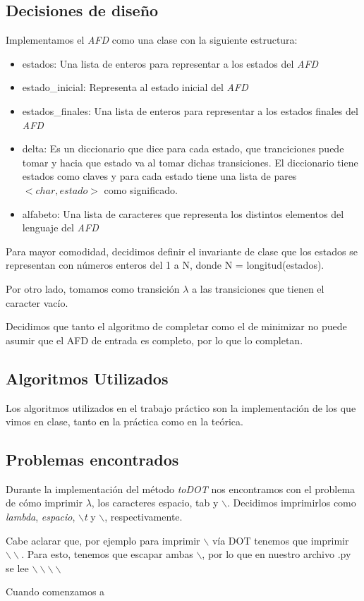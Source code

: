 \subsection{Decisiones de diseño}
Implementamos el \emph{AFD} como una clase con la siguiente estructura:

\begin{itemize}
	\item estados: Una lista de enteros para representar a los estados del \emph{AFD}
	\item estado\_inicial: Representa al estado inicial del \emph{AFD}
	\item estados\_finales: Una lista de enteros para representar a los estados finales del \emph{AFD}
	\item delta: Es un diccionario que dice para cada estado, que tranciciones puede tomar y hacia que estado va al tomar dichas transiciones. El diccionario tiene estados como claves y para cada estado tiene una lista de pares $<char, estado>$ como significado.
	\item alfabeto: Una lista de caracteres que representa los distintos elementos del lenguaje del \emph{AFD}
\end{itemize}

Para mayor comodidad, decidimos definir el invariante de clase que los estados se representan con números enteros del 1 a N, donde N = longitud(estados).

Por otro lado, tomamos como transición $\lambda$ a las transiciones que tienen el caracter vacío.

Decidimos que tanto el algoritmo de completar como el de minimizar no puede asumir que el AFD de entrada es completo, por lo que lo completan.

\subsection{Algoritmos Utilizados}

Los algoritmos utilizados en el trabajo práctico son la implementación de los que vimos en clase, tanto en la práctica como en la teórica.

\subsection{Problemas encontrados}

Durante la implementación del método \emph{toDOT} nos encontramos con el problema de cómo imprimir $\lambda$, los caracteres espacio, tab y $\backslash$. Decidimos imprimirlos como \emph{lambda}, \emph{espacio},  \emph{$\backslash$t} y $\backslash$, respectivamente.

Cabe aclarar que, por ejemplo para imprimir $\backslash$ vía DOT tenemos que imprimir $\backslash\backslash$. Para esto, tenemos que escapar ambas $\backslash$, por lo que en nuestro archivo .py se lee $\backslash\backslash\backslash\backslash$

Cuando comenzamos a 



